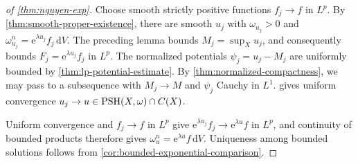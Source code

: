 \begin{proof}[of \cref{thm:nguyen-exp}]
Choose smooth strictly positive functions $f_j\to f$ in $L^p$. By \cref{thm:smooth-proper-existence}, there are smooth $u_j$ with $\omega_{u_j}>0$ and $\omega_{u_j}^n=\mathrm{e}^{\lambda u_j}f_j\,\mathrm{d}V$. The preceding lemma bounds $M_j=\sup_Xu_j$, and consequently bounds $F_j=\mathrm{e}^{\lambda u_j}f_j$ in $L^p$. The normalized potentials $\psi_j=u_j-M_j$ are uniformly bounded by \cref{thm:lp-potential-estimate}. By \cref{thm:normalized-compactness}, we may pass to a subsequence with $M_j\to M$ and $\psi_j$ Cauchy in $L^1$.  gives uniform convergence $u_j\to u\in\mathrm{PSH}(X,\omega)\cap C(X)$.

Uniform convergence and $f_j\to f$ in $L^p$ give
$\mathrm{e}^{\lambda u_j}f_j\to \mathrm{e}^{\lambda u}f$ in $L^p$, and continuity of bounded products therefore gives $\omega_u^n=\mathrm{e}^{\lambda u}f\,\mathrm{d}V$. Uniqueness among bounded solutions follows from \cref{cor:bounded-exponential-comparison}.
\end{proof}

